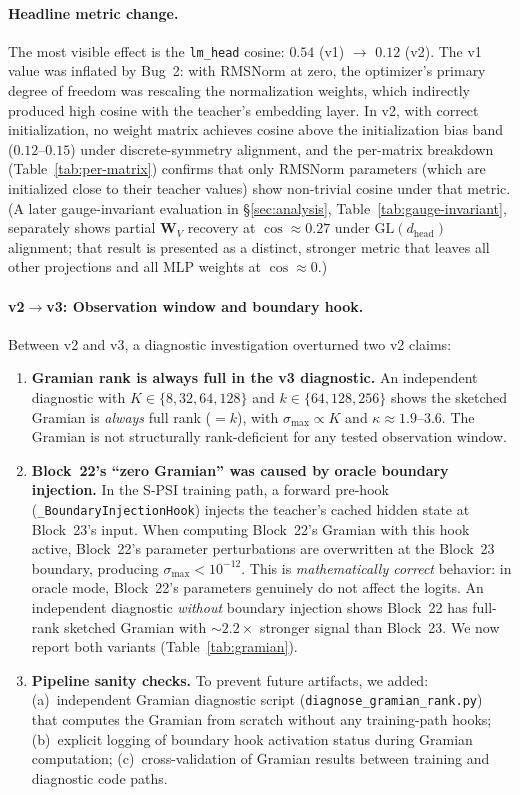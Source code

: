 \documentclass{article}
\newcommand{\bW}{\mathbf{W}}
\begin{document}
\paragraph{Headline metric change.}  The most visible effect is the \texttt{lm\_head} cosine: $0.54$ (v1) $\to$ $0.12$ (v2).  The v1 value was inflated by Bug~2: with RMSNorm at zero, the optimizer's primary degree of freedom was rescaling the normalization weights, which indirectly produced high cosine with the teacher's embedding layer.  In v2, with correct initialization, no weight matrix achieves cosine above the initialization bias band ($0.12$--$0.15$) under discrete-symmetry alignment, and the per-matrix breakdown (Table~\ref{tab:per-matrix}) confirms that only RMSNorm parameters (which are initialized close to their teacher values) show non-trivial cosine under that metric.  (A later gauge-invariant evaluation in \S\ref{sec:analysis}, Table~\ref{tab:gauge-invariant}, separately shows partial $\bW_V$ recovery at $\cos \approx 0.27$ under $\mathrm{GL}(d_\text{head})$ alignment; that result is presented as a distinct, stronger metric that leaves all other projections and all MLP weights at $\cos \approx 0$.)

\paragraph{v2$\to$v3: Observation window and boundary hook.}  Between v2 and v3, a diagnostic investigation overturned two v2 claims:

\begin{enumerate}
    \item \textbf{Gramian rank is always full in the v3 diagnostic.}  An independent diagnostic with $K \in \{8, 32, 64, 128\}$ and $k \in \{64, 128, 256\}$ shows the sketched Gramian is \emph{always} full rank ($= k$), with $\sigma_{\max} \propto K$ and $\kappa \approx 1.9$--$3.6$.  The Gramian is not structurally rank-deficient for any tested observation window.

    \item \textbf{Block~22's ``zero Gramian'' was caused by oracle boundary injection.}  In the S-PSI training path, a forward pre-hook (\texttt{\_BoundaryInjectionHook}) injects the teacher's cached hidden state at Block~23's input.  When computing Block~22's Gramian with this hook active, Block~22's parameter perturbations are overwritten at the Block~23 boundary, producing $\sigma_{\max} < 10^{-12}$.  This is \emph{mathematically correct} behavior: in oracle mode, Block~22's parameters genuinely do not affect the logits.  An independent diagnostic \emph{without} boundary injection shows Block~22 has full-rank sketched Gramian with $\sim 2.2\times$ stronger signal than Block~23.  We now report both variants (Table~\ref{tab:gramian}).

    \item \textbf{Pipeline sanity checks.}  To prevent future artifacts, we added: (a)~independent Gramian diagnostic script (\texttt{diagnose\_gramian\_rank.py}) that computes the Gramian from scratch without any training-path hooks; (b)~explicit logging of boundary hook activation status during Gramian computation; (c)~cross-validation of Gramian results between training and diagnostic code paths.
\end{enumerate}
\end{document}
